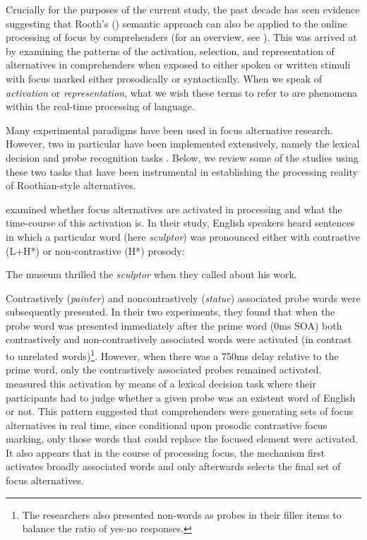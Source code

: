 \documentclass[output=paper,colorlinks,citecolor=brown]{langscibook}
\begin{document}
Crucially for the purposes of the current study, the past decade has seen evidence suggesting that Rooth's (\citeyear{rooth1992}) semantic approach can also be applied to the online processing of focus by comprehenders (for an overview, see \citealt{gotzner2019life}). This was arrived at by examining the patterns of the activation, selection, and representation of alternatives in comprehenders when exposed to either spoken or written stimuli with focus marked either prosodically or syntactically. When we speak of \textit{activation} or \textit{representation}, what we wish these terms to refer to are phenomena within the real-time processing of language.

Many experimental paradigms have been used in focus alternative research. However, two in particular have been implemented extensively, namely the lexical decision \citep{braun2010role,byram2011focus,husband2016role,gotzner2016impact,yan2019priming,yan2022role} and probe recognition tasks \citep{gotzner2016impact,gotzner2017role,jordens2020role,spalek2019neurocognitive}. Below, we review some of the studies using these two tasks that have been instrumental in establishing the processing reality of Roothian-style alternatives.

\citet{husband2016role} examined whether focus alternatives are activated in processing and what the time-course of this activation is. In their study, English speakers heard sentences in which a particular word (here \textit{sculptor}) was pronounced either with contrastive (L+H*) or non-contrastive (H*) prosody:

\ea\label{ex:ex2} The museum thrilled the \textit{sculptor} when they called about his work.
\z

Contrastively (\textit{painter}) and noncontrastively (\textit{statue}) associated probe words were subsequently presented. In their two experiments, they found that when the probe word was presented immediately after the prime word (0ms SOA) both contrastively and non-contrastively associated words were activated (in contrast to unrelated words)\footnote{The researchers also presented non-words as probes in their filler items to balance the ratio of yes-no responses.}. However, when there was a 750ms delay relative to the prime word, only the contrastively associated probes remained activated. \citet{husband2016role} measured this activation by means of a lexical decision task where their participants had to judge whether a given probe was an existent word of English or not. This pattern suggested that comprehenders were generating sets of focus alternatives in real time, since conditional upon prosodic contrastive focus marking, only those words that could replace the focused element were activated. It also appears that in the course of processing focus, the mechanism first activates broadly associated words and only afterwards selects the final set of focus alternatives.
\end{document}
